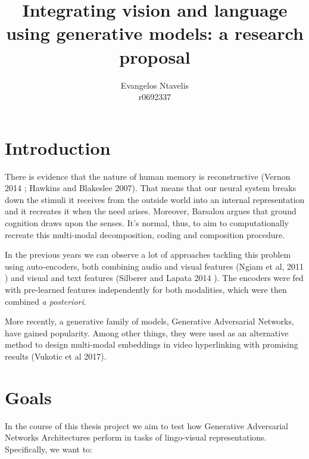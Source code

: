 \documentclass[12pt]{article}
\begin{document}
 
 
 
\title{Integrating vision and language using generative models: a research proposal}
\author{Evangelos Ntavelis\\ %
r0692337\\
} %
 
\maketitle

\section{Introduction}

There is evidence that the nature of human memory is reconstructive (Vernon 2014 \cite{ACS}; Hawkins and Blakeslee 2007\cite{onInt}). That means that our neural system breaks down the stimuli it receives from the outside world into an internal representation and it recreates it when the need arises. Moreover, Barsalou\cite{doi:10.1146/annurev.psych.59.103006.093639} argues that ground cognition draws upon the senses. It's normal, thus, to aim to computationally recreate this multi-modal decomposition, coding and composition procedure.

In the previous years we can observe a lot of approaches tackling this problem using auto-encoders, both combining audio and visual features (Ngiam et al, 2011 \cite{conf/icml/NgiamKKNLN11}) and visual and text features (Silberer and Lapata 2014 \cite{silberer2014learning}). The encoders were fed with pre-learned features independently for both modalities, which were then combined \textit{a posteriori}. 

More recently, a generative family of models, Generative Adversarial Networks, have gained popularity. Among other things, they were used as an alternative method to design multi-modal embeddings in video hyperlinking with promising results (Vukotic et al 2017).

\section{Goals}

In the course of this thesis project we aim to test how Generative Adversarial Networks Architectures perform in tasks of lingo-visual representations. Specifically, we want to:
\end{document}
